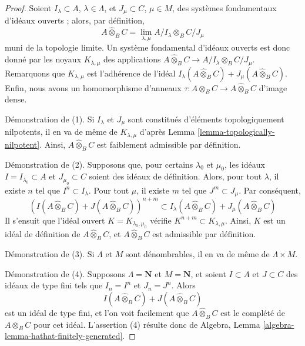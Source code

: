 \begin{proof}
Soient $I_\lambda \subset A$, $\lambda \in \Lambda$, et
$J_\mu \subset C$, $\mu \in M$,
des systèmes fondamentaux d'idéaux ouverts ; alors, par définition,
$$
A \widehat{\otimes}_B C =
\lim_{\lambda, \mu} A/I_\lambda \otimes_B C/J_\mu
$$
muni de la topologie limite. Un système fondamental d'idéaux ouverts
est donc donné par les noyaux $K_{\lambda, \mu}$ des applications
$A \widehat{\otimes}_B C \to A/I_\lambda \otimes_B C/J_\mu$.
Remarquons que $K_{\lambda, \mu}$ est l'adhérence de l'idéal
$I_\lambda(A \widehat{\otimes}_B C) + J_\mu(A \widehat{\otimes}_B C)$.
Enfin, nous avons un homomorphisme d'anneaux
$\tau : A \otimes_B C \to A \widehat{\otimes}_B C$ d'image dense.

\medskip\noindent
Démonstration de (1). Si $I_\lambda$ et $J_\mu$ sont constitués d'éléments topologiquement
nilpotents, il en va de même de $K_{\lambda, \mu}$ d'après
Lemma \ref{lemma-topologically-nilpotent}. Ainsi, 
$A \widehat{\otimes}_B C$ est faiblement admissible par définition.

\medskip\noindent
Démonstration de (2). Supposons que, pour certains $\lambda_0$ et $\mu_0$, les idéaux
$I = I_{\lambda_0} \subset A$ et $J_{\mu_0} \subset C$ soient des idéaux de
définition. Alors, pour tout $\lambda$, il existe $n$ tel que
$I^n \subset I_\lambda$. Pour tout $\mu$, il existe $m$ tel que
$J^m \subset J_\mu$. Par conséquent,
$$
\left(I(A \widehat{\otimes}_B C) + J(A \widehat{\otimes}_B C)\right)^{n + m}
\subset
I_\lambda(A \widehat{\otimes}_B C) + J_\mu(A \widehat{\otimes}_B C)
$$
Il s'ensuit que l'idéal ouvert $K = K_{\lambda_0, \mu_0}$
vérifie $K^{n + m} \subset K_{\lambda, \mu}$. Ainsi, $K$
est un idéal de définition de $A \widehat{\otimes}_B C$,
et $A \widehat{\otimes}_B C$ est admissible par définition.

\medskip\noindent
Démonstration de (3). Si $\Lambda$ et $M$ sont dénombrables, il en va de même de
$\Lambda \times M$.

\medskip\noindent
Démonstration de (4). Supposons $\Lambda = \mathbf{N}$ et $M = \mathbf{N}$,
et soient $I \subset A$ et $J \subset C$ des idéaux de type fini
tels que $I_n = I^n$ et $J_n = J^n$. Alors
$$
I(A \widehat{\otimes}_B C) + J(A \widehat{\otimes}_B C)
$$
est un idéal de type fini, et l'on voit facilement que
$A \widehat{\otimes}_B C$ est le complété de
$A \otimes_B C$ pour cet idéal. L'assertion (4)
résulte donc de Algebra, Lemma \ref{algebra-lemma-hathat-finitely-generated}.


\end{proof}
